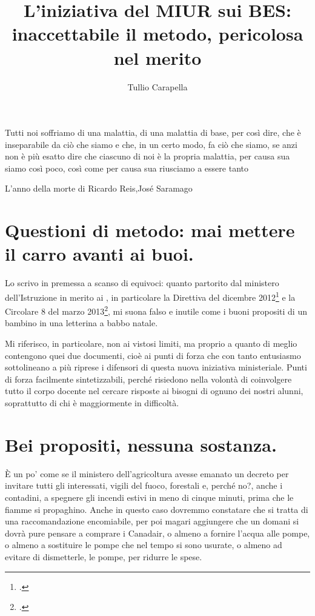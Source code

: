 \author{Tullio Carapella}
\title{L'iniziativa del MIUR sui BES: inaccettabile il metodo, pericolosa nel merito}
\label{cha:TullioCarapella14102013}
\maketitle
\epigraph{Tutti noi soffriamo di una malattia, di una malattia di base, per così dire, che è inseparabile da ciò che siamo e che, in un certo modo, fa ciò che siamo, se anzi non è più esatto dire che ciascuno di noi è la propria malattia, per causa sua siamo così poco, così come per causa sua riusciamo a essere tanto}{L'anno della morte di Ricardo Reis,José Saramago}
\section*{Questioni di metodo: mai mettere il carro avanti ai buoi.}
Lo scrivo in premessa a scanso di equivoci: quanto partorito dal ministero dell'Istruzione in merito ai , in particolare la Direttiva del dicembre 2012\footcite{dir27Dic2012} e la Circolare 8 del marzo 2013\footcite{cm8_2013}, mi suona falso e inutile come i buoni propositi di un bambino in una letterina a babbo natale.

Mi riferisco, in particolare, non ai vistosi limiti, ma proprio a quanto di meglio contengono quei due documenti, cioè ai punti di forza che con tanto entusiasmo sottolineano a più riprese i difensori di questa nuova iniziativa ministeriale. Punti di forza facilmente sintetizzabili, perché risiedono nella volontà di coinvolgere tutto il corpo docente nel cercare risposte ai bisogni di ognuno dei nostri alunni, soprattutto di chi è maggiormente in difficoltà.

\section*{Bei propositi, nessuna sostanza.}
È un po' come se il ministero dell'agricoltura avesse emanato un decreto per invitare tutti gli interessati, vigili del fuoco, forestali e, perché no?, anche i contadini, a spegnere gli incendi estivi in meno di cinque minuti, prima che le fiamme si propaghino. Anche in questo caso dovremmo constatare che si tratta di una raccomandazione encomiabile, per poi magari aggiungere che un domani si dovrà pure pensare a comprare i Canadair, o almeno a fornire l'acqua alle pompe, o almeno a sostituire le pompe che nel tempo si sono usurate, o almeno ad evitare di dismetterle, le pompe, per ridurre le spese.

